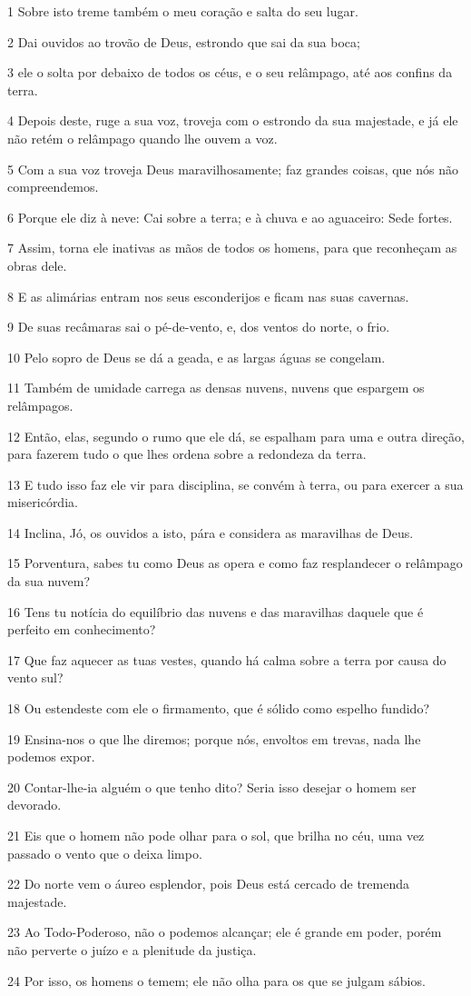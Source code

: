 \par 1 Sobre isto treme também o meu coração e salta do seu lugar.
\par 2 Dai ouvidos ao trovão de Deus, estrondo que sai da sua boca;
\par 3 ele o solta por debaixo de todos os céus, e o seu relâmpago, até aos confins da terra.
\par 4 Depois deste, ruge a sua voz, troveja com o estrondo da sua majestade, e já ele não retém o relâmpago quando lhe ouvem a voz.
\par 5 Com a sua voz troveja Deus maravilhosamente; faz grandes coisas, que nós não compreendemos.
\par 6 Porque ele diz à neve: Cai sobre a terra; e à chuva e ao aguaceiro: Sede fortes.
\par 7 Assim, torna ele inativas as mãos de todos os homens, para que reconheçam as obras dele.
\par 8 E as alimárias entram nos seus esconderijos e ficam nas suas cavernas.
\par 9 De suas recâmaras sai o pé-de-vento, e, dos ventos do norte, o frio.
\par 10 Pelo sopro de Deus se dá a geada, e as largas águas se congelam.
\par 11 Também de umidade carrega as densas nuvens, nuvens que espargem os relâmpagos.
\par 12 Então, elas, segundo o rumo que ele dá, se espalham para uma e outra direção, para fazerem tudo o que lhes ordena sobre a redondeza da terra.
\par 13 E tudo isso faz ele vir para disciplina, se convém à terra, ou para exercer a sua misericórdia.
\par 14 Inclina, Jó, os ouvidos a isto, pára e considera as maravilhas de Deus.
\par 15 Porventura, sabes tu como Deus as opera e como faz resplandecer o relâmpago da sua nuvem?
\par 16 Tens tu notícia do equilíbrio das nuvens e das maravilhas daquele que é perfeito em conhecimento?
\par 17 Que faz aquecer as tuas vestes, quando há calma sobre a terra por causa do vento sul?
\par 18 Ou estendeste com ele o firmamento, que é sólido como espelho fundido?
\par 19 Ensina-nos o que lhe diremos; porque nós, envoltos em trevas, nada lhe podemos expor.
\par 20 Contar-lhe-ia alguém o que tenho dito? Seria isso desejar o homem ser devorado.
\par 21 Eis que o homem não pode olhar para o sol, que brilha no céu, uma vez passado o vento que o deixa limpo.
\par 22 Do norte vem o áureo esplendor, pois Deus está cercado de tremenda majestade.
\par 23 Ao Todo-Poderoso, não o podemos alcançar; ele é grande em poder, porém não perverte o juízo e a plenitude da justiça.
\par 24 Por isso, os homens o temem; ele não olha para os que se julgam sábios.

